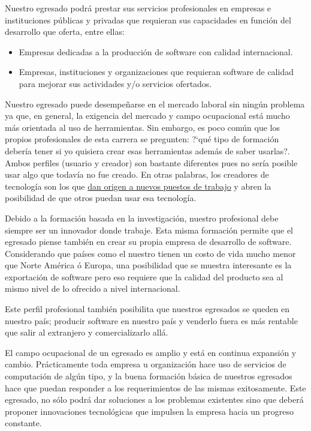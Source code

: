 Nuestro egresado podrá prestar sus servicios profesionales en empresas e instituciones públicas y privadas 
que requieran sus capacidades en función del desarrollo que oferta, entre ellas:

\begin{itemize}
\item Empresas dedicadas a la producción de software con calidad internacional.
\item Empresas, instituciones y organizaciones que requieran software de calidad para mejorar sus actividades y/o servicios ofertados.
\end{itemize}

Nuestro egresado puede desempeñarse en el mercado laboral sin ningún problema ya que, en general, la 
exigencia del mercado y campo ocupacional está mucho más orientada al uso de herramientas. Sin embargo, 
es poco común que los propios profesionales de esta carrera se pregunten: ?`qué tipo de formación debería 
tener si yo quisiera crear esas herramientas además de saber usarlas?. Ambos perfiles (usuario y creador) 
son bastante diferentes pues no sería posible usar algo que todavía no fue creado. En otras palabras, 
los creadores de tecnología son los que \underline{dan origen a nuevos puestos de trabajo} y abren la 
posibilidad de que otros puedan usar esa tecnología.

Debido a la formación basada en la investigación, nuestro profesional debe siempre ser un innovador 
donde trabaje. Esta misma formación permite que el egresado piense también en crear su propia empresa 
de desarrollo de software. Considerando que países como el nuestro tienen un costo de vida mucho menor 
que Norte América ó Europa, una posibilidad que se muestra interesante es la exportación de software 
pero eso requiere que la calidad del producto sea al mismo nivel de lo ofrecido a nivel internacional.

Este perfil profesional también posibilita que nuestros egresados se queden en nuestro país; producir 
software en nuestro país y venderlo fuera es más rentable que salir al extranjero y comercializarlo allá.

El campo ocupacional de un egresado es amplio y está en continua expansión y cambio. Prácticamente 
toda empresa u organización hace uso de servicios de computación de algún tipo, y la buena formación 
básica de nuestros egresados hace que puedan responder a los requerimientos de las mismas exitosamente. 
Este egresado, no sólo podrá dar soluciones a los problemas existentes sino que deberá proponer innovaciones 
tecnológicas que impulsen la empresa hacia un progreso constante.

